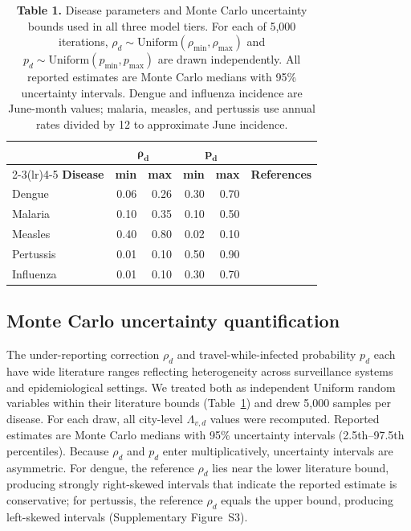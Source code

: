 \documentclass[12pt, a4paper]{article}
\begin{document}
\begin{table}[htbp]
\centering
\caption{\textbf{Table 1.} Disease parameters and Monte Carlo uncertainty bounds used in all three model tiers. For each of 5,000 iterations, $\rho_d \sim \mathrm{Uniform}(\rho_{\min},\rho_{\max})$ and $p_d \sim \mathrm{Uniform}(p_{\min},p_{\max})$ are drawn independently. All reported estimates are Monte Carlo medians with 95\% uncertainty intervals. Dengue and influenza incidence are June-month values; malaria, measles, and pertussis use annual rates divided by 12 to approximate June incidence.}
\label{tab:params}
\small
\setlength{\tabcolsep}{6pt}
\begin{tabular}{l rr rr l}
\toprule
&
  \multicolumn{2}{c}{$\boldsymbol{\rho_d}$} &
  \multicolumn{2}{c}{$\boldsymbol{p_d}$} & \\
\cmidrule(lr){2-3}\cmidrule(lr){4-5}
\textbf{Disease} &
  \textbf{min} & \textbf{max} &
  \textbf{min} & \textbf{max} &
  \textbf{References} \\
\midrule
Dengue    & 0.06 & 0.26 & 0.30 & 0.70 & \citep{Bhatt2013,undurraga2013} \\[3pt]
Malaria   & 0.10 & 0.35 & 0.10 & 0.50 & \citep{whoWMR2024,lindblade2013,topazian2020} \\[3pt]
Measles   & 0.40 & 0.80 & 0.02 & 0.10 & \citep{simons2012,whittle1999,helfand1998} \\[3pt]
Pertussis & 0.01 & 0.10 & 0.50 & 0.90 & \citep{chen2016,craig2020,althouse2015} \\[3pt]
Influenza & 0.01 & 0.10 & 0.30 & 0.70 & \citep{mccarthy2020,hayward2014,carrat2008,leung2015} \\
\bottomrule
\end{tabular}
\end{table}

\subsection{Monte Carlo uncertainty quantification}

The under-reporting correction $\rho_d$ and travel-while-infected probability $p_d$ each have wide literature ranges reflecting heterogeneity across surveillance systems and epidemiological settings. We treated both as independent Uniform random variables within their literature bounds (Table~\ref{tab:params}) and drew 5,000 samples per disease. For each draw, all city-level $\Lambda_{v,d}$ values were recomputed. Reported estimates are Monte Carlo medians with 95\% uncertainty intervals (2.5th--97.5th percentiles). Because $\rho_d$ and $p_d$ enter multiplicatively, uncertainty intervals are asymmetric. For dengue, the reference $\rho_d$ lies near the lower literature bound, producing strongly right-skewed intervals that indicate the reported estimate is conservative; for pertussis, the reference $\rho_d$ equals the upper bound, producing left-skewed intervals (Supplementary Figure~S3).
\end{document}
